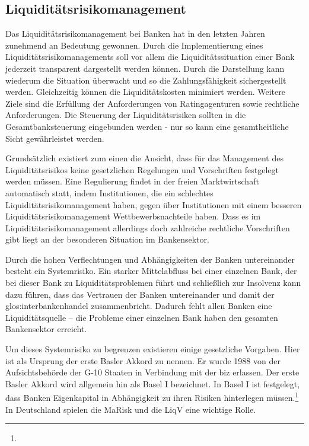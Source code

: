 \begin{onehalfspacing}
\section{Liquiditätsrisikomanagement}
Das Liquiditätsrisikomanagement bei Banken hat in den letzten Jahren zunehmend an Bedeutung gewonnen. Durch die Implementierung eines Liquiditätsrisikomanagements  soll vor allem die Liquiditätssituation einer Bank jederzeit transparent dargestellt werden können. Durch die Darstellung kann wiederum die Situation überwacht und so die Zahlungsfähigkeit sichergestellt werden. Gleichzeitig können die Liquiditätskosten minimiert werden. Weitere Ziele sind die Erfüllung der Anforderungen von Ratingagenturen sowie rechtliche Anforderungen. Die Steuerung der Liquiditätsrisiken sollten in die Gesamtbanksteuerung eingebunden werden - nur so kann eine gesamtheitliche Sicht gewährleistet werden.

Grundsätzlich existiert zum einen die Ansicht, dass für das Management des Liquiditätsrisikos keine gesetzlichen Regelungen und Vorschriften festgelegt werden müssen. Eine Regulierung findet in der freien Marktwirtschaft automatisch statt, indem Institutionen, die ein schlechtes Liquiditätsrisikomanagement haben, gegen über Institutionen mit einem besseren Liquiditätsrisikomanagement Wettbewerbsnachteile haben. Dass es im Liquiditätsrisikomanagement allerdings doch zahlreiche rechtliche Vorschriften gibt liegt an der besonderen Situation im Bankensektor.

Durch die hohen Verflechtungen und Abhängigkeiten der Banken untereinander besteht ein Systemrisiko. Ein starker Mittelabfluss bei einer einzelnen Bank, der bei dieser Bank zu Liquiditätsproblemen führt und schließlich zur Insolvenz kann dazu führen, dass das Vertrauen der Banken untereinander und damit der \gls{glos:interbankenhandel} zusammenbricht. Dadurch fehlt allen Banken eine Liquiditätsquelle -- die Probleme einer einzelnen Bank haben den gesamten Bankensektor erreicht.

Um dieses Systemrisiko zu begrenzen existieren einige gesetzliche Vorgaben. Hier ist als Ursprung der erste Basler Akkord zu nennen. Er wurde 1988 von der Aufsichtsbehörde der G-10 Staaten in Verbindung mit der \gls{biz} erlassen. Der erste Basler Akkord wird allgemein hin als Basel I bezeichnet. In Basel I ist festgelegt, dass Banken Eigenkapital in Abhängigkeit zu ihren Risiken hinterlegen müssen.\footnote{ } In Deutschland spielen die \gls{MaRisk} und die \gls{LiqV} eine wichtige Rolle.


\end{onehalfspacing}
